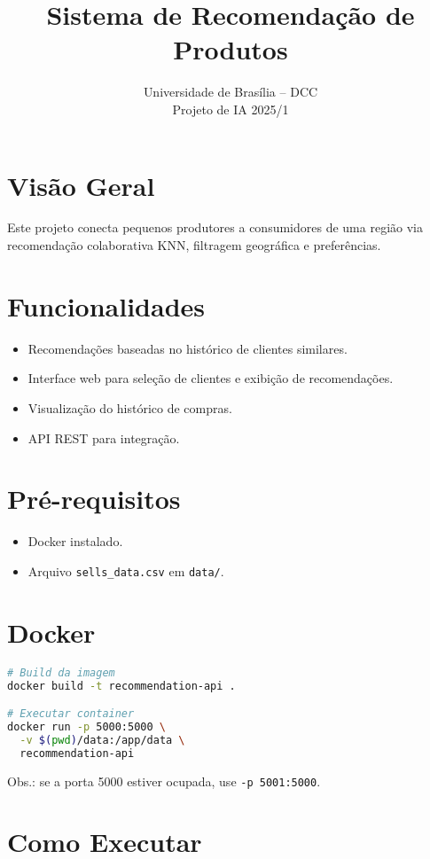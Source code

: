 \documentclass[a4paper,12pt]{article}
\title{\Huge Sistema de Recomendação de Produtos}
\author{Universidade de Brasília -- DCC \\ Projeto de IA 2025/1}
\date{}
\begin{document}
\maketitle

\section*{Visão Geral}
Este projeto conecta pequenos produtores a consumidores de uma região via
recomendação colaborativa KNN, filtragem geográfica e preferências.

\section*{Funcionalidades}
\begin{itemize}
    \item Recomendações baseadas no histórico de clientes similares.
    \item Interface web para seleção de clientes e exibição de recomendações.
    \item Visualização do histórico de compras.
    \item API REST para integração.
\end{itemize}

\section*{Pré-requisitos}
\begin{itemize}
    \item Docker instalado.
    \item Arquivo \texttt{sells\_data.csv} em \texttt{data/}.
\end{itemize}

\section*{Docker}
\begin{lstlisting}[language=bash]
# Build da imagem
docker build -t recommendation-api .

# Executar container
docker run -p 5000:5000 \
  -v $(pwd)/data:/app/data \
  recommendation-api
\end{lstlisting}
Obs.: se a porta 5000 estiver ocupada, use \texttt{-p 5001:5000}.

\section*{Como Executar}
\end{document}
